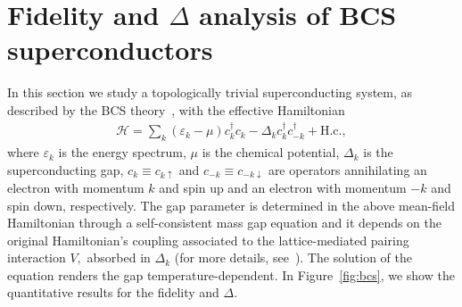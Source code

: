 \section{Fidelity and $\Delta$ analysis of BCS superconductors}
\label{sec:bcs}
In this section we study a topologically trivial superconducting system, as described by the BCS theory~\cite{bar:coo:sch:57}, with the effective Hamiltonian 
\begin{eqnarray}
\label{eq:BCS_MF}
\mathcal{H}=\sum_{k} (\varepsilon_{k}-\mu)c_{k}^{\dagger}c_{k}-\Delta_{k} c_{k}^{\dagger}c_{-k}^{\dagger} + \text{H.c.},
\end{eqnarray}
where $\varepsilon_k$ is the energy spectrum, $\mu$ is the chemical potential, $\Delta_{k}$ is the superconducting gap, $c_{k}\equiv c_{k\uparrow}$ and $c_{-k}\equiv c_{-k \downarrow}$ are operators annihilating an electron with momentum $k$ and spin up and an electron with momentum $-k$ and spin down, respectively. The gap parameter is determined in the above mean-field Hamiltonian through a self-consistent mass gap equation and it depends on the original Hamiltonian's coupling associated to the lattice-mediated pairing interaction $V,$ absorbed in $\Delta_k$ (for more details, see~\cite{pau:vie:08}). The solution of the equation renders the gap temperature-dependent.
In Figure~\ref{fig:bcs}, we show the quantitative results for the fidelity and $\Delta$. 
